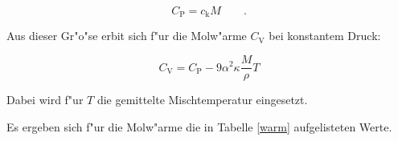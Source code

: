 \begin{equation}
	C_\mathrm{P} = c_\mathrm{k} M \qquad .
\end{equation}

Aus dieser Gr"o"se erbit sich f"ur die Molw"arme $C_\mathrm{V}$ bei konstantem Druck:

\begin{equation}
		C_\mathrm{V} = C_\mathrm{P} - 9 \alpha^2 \kappa \frac{M}{\rho} T
\end{equation}

Dabei wird f"ur $T$ die gemittelte Mischtemperatur eingesetzt.

Es ergeben sich f"ur die Molw"arme die in Tabelle \ref{warm} aufgelisteten Werte.